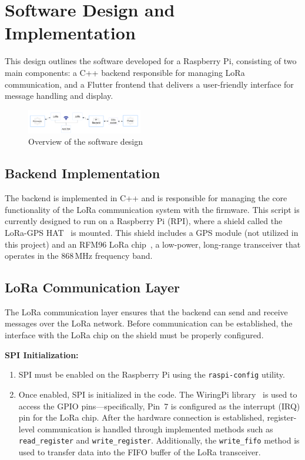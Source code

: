 \section{Software Design and Implementation}

This design outlines the software developed for a Raspberry Pi, consisting of two main components: a C++ backend responsible for managing LoRa communication, and a Flutter frontend that delivers a user-friendly interface for message handling and display.

\begin{figure}[H]
\centering
\includegraphics[width=0.45\textwidth]{images/lora-shield.png}
\caption{Overview of the software design}\label{fig:lora-shield}
\end{figure}

\subsection{Backend Implementation}

The backend is implemented in C++ and is responsible for managing the core functionality of the LoRa communication system with the firmware. 
This script is currently designed to run on a Raspberry Pi (RPI), where a shield called the LoRa-GPS HAT~\cite{LoRa-GPS-HAT} is mounted. 
This shield includes a GPS module (not utilized in this project) and an RFM96 LoRa chip~\cite{LoRa module}, a low-power, 
long-range transceiver that operates in the 868\,MHz frequency band.

\subsection{LoRa Communication Layer}

The LoRa communication layer ensures that the backend can send and receive messages over the LoRa network.
Before communication can be established, the interface with the LoRa chip on the shield must be properly configured.

\vspace{0.5em}
\textbf{SPI Initialization:}

\begin{enumerate}
  \item SPI must be enabled on the Raspberry Pi using the \texttt{raspi-config} utility.
  \item Once enabled, SPI is initialized in the code. The WiringPi library~\cite{WiringPi} is used to access the GPIO pins—specifically, 
  Pin~7 is configured as the interrupt (IRQ) pin for the LoRa chip. After the hardware connection is established, register-level communication is handled through implemented methods such as \texttt{read\_register} and \texttt{write\_register}. Additionally, the \texttt{write\_fifo} method is used to transfer data into the FIFO buffer of the LoRa transceiver.
\end{enumerate}

